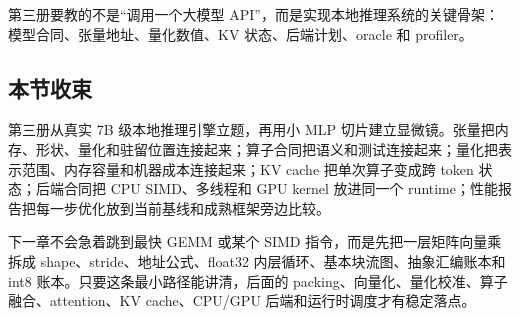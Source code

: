 \begin{keyidea}
第三册要教的不是“调用一个大模型 API”，而是实现本地推理系统的关键骨架：模型合同、张量地址、量化数值、KV 状态、后端计划、oracle 和 profiler。
\end{keyidea}

\subsection{本节收束}

第三册从真实 7B 级本地推理引擎立题，再用小 MLP 切片建立显微镜。张量把内存、形状、量化和驻留位置连接起来；算子合同把语义和测试连接起来；量化把表示范围、内存容量和机器成本连接起来；KV cache 把单次算子变成跨 token 状态；后端合同把 CPU SIMD、多线程和 GPU kernel 放进同一个 runtime；性能报告把每一步优化放到当前基线和成熟框架旁边比较。

下一章不会急着跳到最快 GEMM 或某个 SIMD 指令，而是先把一层矩阵向量乘拆成 shape、stride、地址公式、float32 内层循环、基本块流图、抽象汇编账本和 int8 账本。只要这条最小路径能讲清，后面的 packing、向量化、量化校准、算子融合、attention、KV cache、CPU/GPU 后端和运行时调度才有稳定落点。
